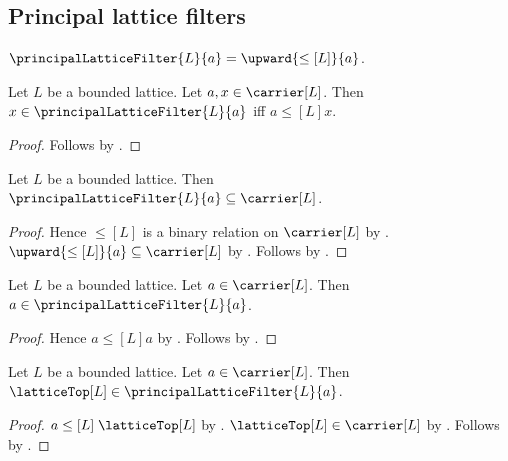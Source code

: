 \subsection{Principal lattice filters}

\begin{definition}\label{principal_lattice_filter}
    $\principalLatticeFilter{L}{a}=\upward{\leq[L]}{a}$.
\end{definition}

\begin{proposition}\label{principal_lattice_filter_iff}
    Let $L$ be a bounded lattice.
    Let $a,x\in\carrier[L]$.
    Then $x\in\principalLatticeFilter{L}{a}$ iff
        $a\mathrel{\leq[L]}x$.
\end{proposition}
\begin{proof}
    Follows by
        .
\end{proof}

\begin{proposition}\label{principal_lattice_filter_subseteq_carrier}
    Let $L$ be a bounded lattice.
    Then $\principalLatticeFilter{L}{a}\subseteq\carrier[L]$.
\end{proposition}
\begin{proof}
    Hence $\leq[L]$ is a binary relation on $\carrier[L]$ by
        .
    $\upward{\leq[L]}{a}\subseteq\carrier[L]$ by
        .
    Follows by .
\end{proof}

\begin{proposition}\label{principal_lattice_filter_contains_generator}
    Let $L$ be a bounded lattice.
    Let $a\in\carrier[L]$.
    Then $a\in\principalLatticeFilter{L}{a}$.
\end{proposition}
\begin{proof}
    Hence $a\mathrel{\leq[L]}a$ by
        .
    Follows by .
\end{proof}

\begin{proposition}\label{principal_lattice_filter_contains_top}
    Let $L$ be a bounded lattice.
    Let $a\in\carrier[L]$.
    Then $\latticeTop[L]\in\principalLatticeFilter{L}{a}$.
\end{proposition}
\begin{proof}
    $a\mathrel{\leq[L]}\latticeTop[L]$ by
        .
    $\latticeTop[L]\in\carrier[L]$ by .
    Follows by .
\end{proof}

